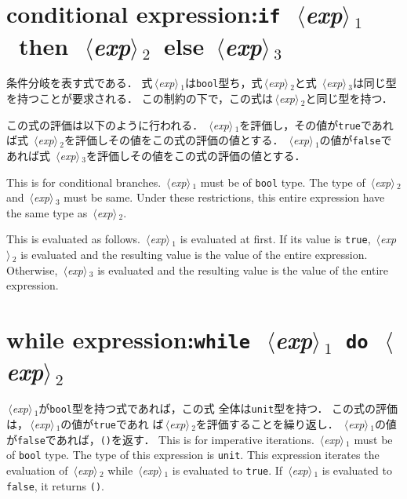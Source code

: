 \documentclass{jbook}
\newcommand{\txt}[2]{#2}
\newcommand{\code}[1]{\mbox{\large\tt #1}}
\newcommand{\nonterm}[1]{\mbox{$\,\langle$}{\it #1}\mbox{$\rangle\,$}}
\newcommand{\term}[1]{\mbox{{\tt #1}}}
\begin{document}
\section{\txt{条件式}{conditional expression}:\term{if}\ \nonterm{exp}$_1$\ then\ \nonterm{exp}$_2$\
else \nonterm{exp}$_3$}

\ifjp%
	条件分岐を表す式である．
	式\nonterm{exp}$_1$は\code{bool}型ち，式\nonterm{exp}$_2$と式
\nonterm{exp}$_3$は同じ型を持つことが要求される．
	この制約の下で，この式は\nonterm{exp}$_2$と同じ型を持つ．
	
	この式の評価は以下のように行われる．
	\nonterm{exp}$_1$を評価し，その値が\code{true}であれば式
\nonterm{exp}$_2$を評価しその値をこの式の評価の値とする．
	\nonterm{exp}$_1$の値が\code{false}であれば式
\nonterm{exp}$_3$を評価しその値をこの式の評価の値とする．

\else%
	This is for conditional branches.
	\nonterm{exp}$_1$ must be of \code{bool} type.
	The type of \nonterm{exp}$_2$ and \nonterm{exp}$_3$ must be
same.
	Under these restrictions,
this entire expression have the same type as \nonterm{exp}$_2$.

	This is evaluated as follows.
	\nonterm{exp}$_1$ is evaluated at first.
	If its value is \code{true},
\nonterm{exp}$_2$ is evaluated and the resulting value is the value
of the entire expression.
	Otherwise,
\nonterm{exp}$_3$ is evaluated and the resulting value is the value
of the entire expression.
\fi%

\section{\txt{while式}{while expression}:\term{while}\ \nonterm{exp}$_1$\ \term{do}\ \nonterm{exp}$_2$}
\ifjp%
	\nonterm{exp}$_1$が\code{bool}型を持つ式であれば，この式
全体は\code{unit}型を持つ．
	この式の評価は，\nonterm{exp}$_1$の値が\code{true}であれ
ば\nonterm{exp}$_2$を評価することを繰り返し．
	\nonterm{exp}$_1$の値が\code{false}であれば，\code{()}を返す．
\else%
	This is for imperative iterations.
	\nonterm{exp}$_1$ must be of \code{bool} type.
	The type of this expression is \code{unit}.
	This expression iterates the evaluation of \nonterm{exp}$_2$
while \nonterm{exp}$_1$ is evaluated to \code{true}.
	If \nonterm{exp}$_1$ is evaluated to \code{false}, it
returns \code{()}.
\fi%
\end{document}
